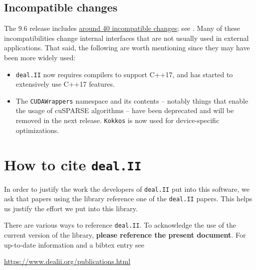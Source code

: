 \documentclass{ansarticle-preprint}
\newcommand{\specialword}[1]{\texttt{#1}}
\newcommand{\dealii}{{\specialword{deal.II}}\xspace}
\newcommand{\kokkos}{{\specialword{Kokkos}}\xspace}
\begin{document}



\subsection{Incompatible changes}\label{subsec:deprecated}

The 9.6 release includes
\href{https://dealii.org/developer/doxygen/deal.II/changes_between_9_5_2_and_9_6_0.html}
     {around 40 incompatible changes};
see \cite{changes96}. Many of these
incompatibilities change internal
interfaces that are not usually used in external
applications. That said, the following are worth mentioning since they
may have been more widely used:
\begin{itemize}
  \item \dealii{} now requires compilers to support C++17, and has
    started to extensively use C++17 features.
  \item The \texttt{CUDAWrappers} namespace and its contents --
    notably things that enable the usage of cuSPARSE algorithms --
    have been deprecated and will be removed in the next
    release. \kokkos{} is now used for device-specific optimizations.
\end{itemize}



\section{How to cite \dealii}\label{sec:cite}

In order to justify the work the developers of \dealii put into this
software, we ask that papers using the library reference one of the
\dealii papers. This helps us justify the effort we put into this library.

There are various ways to reference \dealii. To acknowledge the use of
the current version of the library, \textbf{please reference the present
  document}. For up-to-date information and a bibtex entry
see
\begin{center}
  \url{https://www.dealii.org/publications.html}
\end{center}
\end{document}
